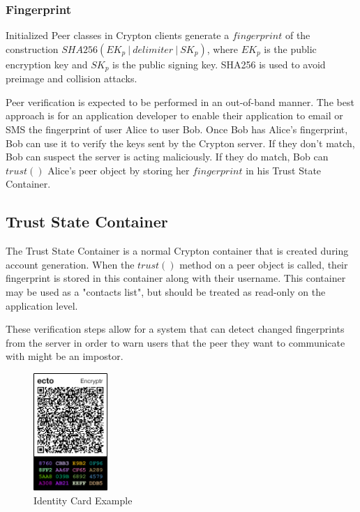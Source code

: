 \documentclass[conference]{IEEEtran}
\begin{document}
\subsubsection{Fingerprint}
Initialized Peer classes in Crypton clients generate a \(fingerprint\) of the
construction \(SHA256(EK_p\ |\ delimiter\ |\ SK_p)\), where \(EK_p\) is the
public encryption key and \(SK_p\) is the public signing key. SHA256 is used to
avoid preimage and collision attacks.

Peer verification is expected to be performed in an out-of-band manner.
The best approach is for an application developer to enable their application
to email or SMS the fingerprint of user Alice to user Bob. Once Bob has Alice's 
fingerprint, Bob can use it to verify the keys sent by the Crypton server. If they
don't match, Bob can suspect the server is acting maliciously. If they
do match, Bob can \(trust()\) Alice's peer object by storing her \(fingerprint\)
in his Trust State Container.

\subsection{Trust State Container}
The Trust State Container is a normal Crypton container that is created
during account generation. When the \(trust()\) method on a peer object is called,
their fingerprint is stored in this container along with their username. This
container may be used as a "contacts list", but should be treated as read-only
on the application level.

These verification steps allow for a system that can detect changed fingerprints
from the server in order to warn users that the peer they want to communicate with
might be an impostor.

\begin{figure}[h]
  \centering
  \includegraphics[width=0.25\textwidth]{id-card-border.png}
  \caption{Identity Card Example}
\end{figure}
\end{document}
